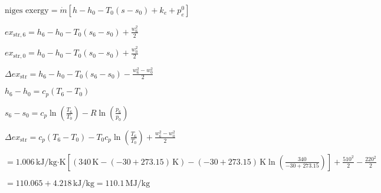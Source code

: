 \( \text{niges exergy} = \dot{m} \left[ h - h_0 - T_0 (s - s_0) + k_e + p_e^0 \right] \)  

\( ex_{\text{str},6} = h_6 - h_0 - T_0 (s_6 - s_0) + \frac{w_6^2}{2} \)  

\( ex_{\text{str},0} = h_0 - h_0 - T_0 (s_0 - s_0) + \frac{w_0^2}{2} \)  

\( \Delta ex_{\text{str}} = h_6 - h_0 - T_0 (s_6 - s_0) - \frac{w_6^2 - w_0^2}{2} \)  

\( h_6 - h_0 = c_p (T_6 - T_0) \)  

\( s_6 - s_0 = c_p \ln \left( \frac{T_6}{T_0} \right) - R \ln \left( \frac{p_6}{p_0} \right) \)  

\( \Delta ex_{\text{str}} = c_p (T_6 - T_0) - T_0 c_p \ln \left( \frac{T_6}{T_0} \right) + \frac{w_6^2 - w_0^2}{2} \)  

\( = 1.006 \, \text{kJ/kg·K} \left[ (340 \, \text{K} - (-30 + 273.15) \, \text{K}) - (-30 + 273.15) \, \text{K} \ln \left( \frac{340}{-30 + 273.15} \right) \right] + \frac{510^2}{2} - \frac{220^2}{2} \)  

\( = 110.065 + 4.218 \, \text{kJ/kg} = 110.1 \, \text{MJ/kg} \)